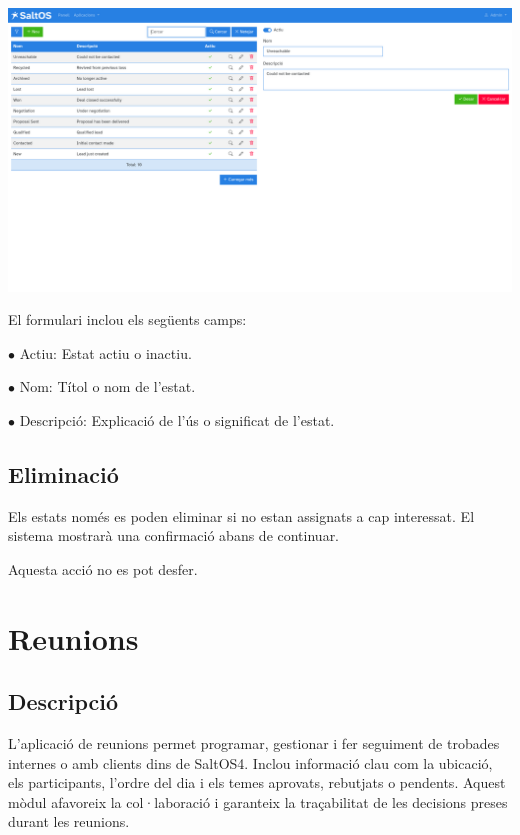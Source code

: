 \documentclass[a4paper]{article}
\begin{document}
\begin{center}\includegraphics[width=1\textwidth]{../ujest/snaps/test-screenshots-js-screenshots-crm-leads-status-edit-10-ca-es-1-snap.png}\end{center}

El formulari inclou els següents camps:

\begin{compactitem}
\item[\color{myblue}$\bullet$] Actiu: Estat actiu o inactiu.
\item[\color{myblue}$\bullet$] Nom: Títol o nom de l'estat.
\item[\color{myblue}$\bullet$] Descripció: Explicació de l'ús o significat de l'estat.
\end{compactitem}

\hypertarget{toc65}{}
\subsection{Eliminació}

Els estats només es poden eliminar si no estan assignats a cap interessat.
El sistema mostrarà una confirmació abans de continuar.

Aquesta acció no es pot desfer.


\hypertarget{toc66}{}
\section{Reunions}

\hypertarget{toc67}{}
\subsection{Descripció}

L'aplicació de reunions permet programar, gestionar i fer seguiment de trobades internes o amb clients dins de SaltOS4.
Inclou informació clau com la ubicació, els participants, l'ordre del dia i els temes aprovats, rebutjats o pendents.
Aquest mòdul afavoreix la col·laboració i garanteix la traçabilitat de les decisions preses durant les reunions.
\end{document}
